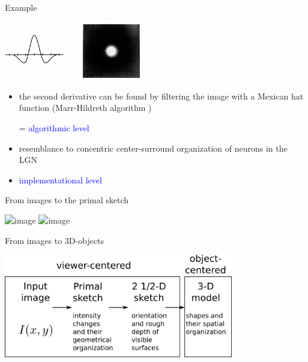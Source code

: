 \documentclass[]{beamer}
\begin{document}
\begin{frame}{Example}
 \begin{center}
\includegraphics[width=60mm]{figs/marr_hildred_mexican_hat.png}
\end{center}
 \begin{itemize}
 \item the second derivative can be found by filtering the image with a Mexican hat function (Marr-Hildreth algorithm )  
\item[=] \textcolor{blue}{algorithmic level}
  
 \item<2-> resemblance to concentric center-surround organization of neurons in the LGN
 \item<2->[=] \textcolor{blue}{implementational level} 
\end{itemize}
\end{frame}


\begin{frame}{From images to the primal sketch}
 \begin{center}
\includegraphics<1>[width=60mm]{figs/marr_primal_sketch.png}
 \includegraphics<2>[width=80mm]{../../../figures/odog_model.png}

\end{center}
 \end{frame}



\begin{frame}{From images to 3D-objects}
 \begin{center}
\includegraphics[width=100mm]{figs/marr_representations.png}
\end{center}
\end{frame}
\end{document}
